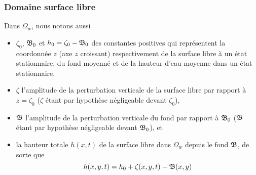 \subsubsection{Domaine surface libre}
Dans $\Omega_w$, nous notons aussi
\begin{itemize}[label=$\mybullet$]
	\item $\zeta_0$, $\mathfrak{B}_0$ et $h_0 = \zeta_0 - \mathfrak{B}_0$ des constantes positives qui représentent la coordonnée $z$ (axe $z$ croissant) respectivement de la surface libre à un état stationnaire, du fond moyenné et de la hauteur d'eau moyenne dans un état stationnaire,
	\item $\zeta$ l'amplitude de la perturbation verticale de la surface libre par rapport à $z=\zeta_0$ ($\zeta$ étant par hypothèse négligeable devant $\zeta_0$), 
	\item $\mathfrak{B}$ l'amplitude de la perturbation verticale du fond par rapport à $\mathfrak{B}_0$ ($\mathfrak{B}$ étant par hypothèse négligeable devant $\mathfrak{B}_0$), et
	\item la hauteur totale $h(x, t)$ de la surface libre dans $\Omega_w$ depuis le fond $\mathfrak{B}$, de sorte que
	\begin{equation*}
	h(x, y, t) = h_0 + \zeta(x, y, t) - \mathfrak{B} (x, y) 
	\end{equation*}
\end{itemize}


